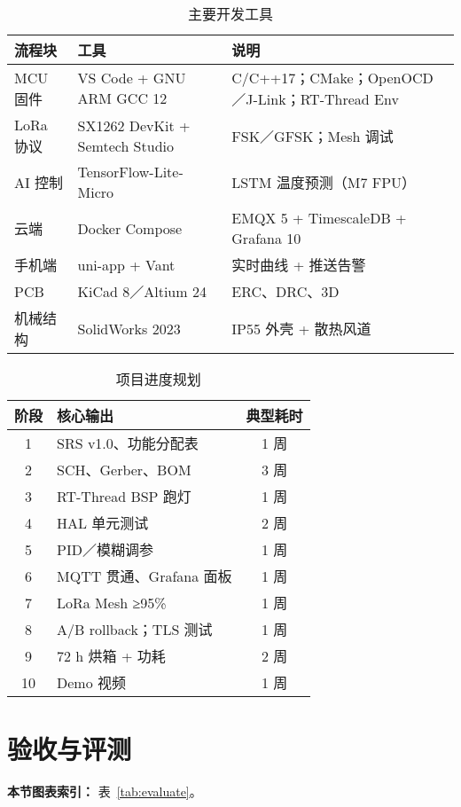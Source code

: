 \documentclass[UTF8,a4paper]{ctexart}
\newcommand{\tabfont}{\zihao{-5}}
\begin{document}
\begin{table}[htbp]
    \centering
    \caption{主要开发工具}
    \label{tab:tools}
    \tabfont
    \begin{tabular}{@{}p{3cm}p{4cm}p{6cm}@{}}
        \toprule
        流程块 & 工具 & 说明 \\ \midrule
        MCU 固件 & VS Code + GNU ARM GCC 12 & C/C++17；CMake；OpenOCD／J-Link；RT-Thread Env \\
        LoRa 协议 & SX1262 DevKit + Semtech Studio & FSK／GFSK；Mesh 调试 \\
        AI 控制 & TensorFlow-Lite-Micro & LSTM 温度预测（M7 FPU） \\
        云端 & Docker Compose & EMQX 5 + TimescaleDB + Grafana 10 \\
        手机端 & uni-app + Vant & 实时曲线 + 推送告警 \\
        PCB & KiCad 8／Altium 24 & ERC、DRC、3D \\
        机械结构 & SolidWorks 2023 & IP55 外壳 + 散热风道 \\ \bottomrule
    \end{tabular}
\end{table}
\vspace{-3em}
\begin{table}[htbp]
    \centering
    \caption{项目进度规划}
    \label{tab:mile}
    \tabfont
    \begin{tabular}{@{}cp{6cm}c@{}}
        \toprule
        阶段 & 核心输出 & 典型耗时 \\ \midrule
        1 & SRS v1.0、功能分配表 & 1 周 \\
        2 & SCH、Gerber、BOM & 3 周 \\
        3 & RT-Thread BSP 跑灯 & 1 周 \\
        4 & HAL 单元测试 & 2 周 \\
        5 & PID／模糊调参 & 1 周 \\
        6 & MQTT 贯通、Grafana 面板 & 1 周 \\
        7 & LoRa Mesh ≥95\% & 1 周 \\
        8 & A/B rollback；TLS 测试 & 1 周 \\
        9 & 72 h 烘箱 + 功耗 & 2 周 \\
        10 & Demo 视频 & 1 周 \\ \bottomrule
    \end{tabular}
\end{table}

\section{验收与评测}
\textbf{本节图表索引：} 表~\ref{tab:evaluate}。
\end{document}
